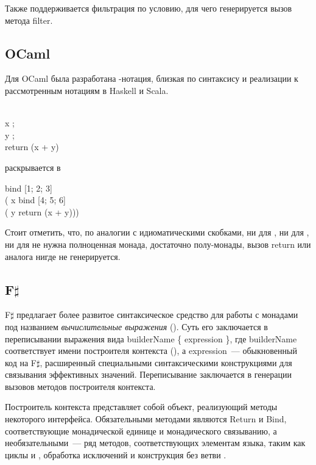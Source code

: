 Также поддерживается фильтрация по условию, для чего генерируется вызов метода \<filter\>. 

\subsection{OCaml}
Для OCaml\cite{leroy2010objective} была разработана \<\>-нотация\cite{carettesyntax}, близкая по синтаксису и реализации к рассмотренным нотациям в Haskell и Scala.

\begin{haskell}
 \\
\quad\quad x \longleftarrow [1; 2; 3]; \\
\quad\quad y \longleftarrow [4; 5; 6]; \\
\quad\quad return (x + y)
\end{haskell}
\hspace{0cm}раскрывается в
\begin{haskell}
bind [1; 2; 3] \\
\quad\quad\quad ( x \to bind [4; 5; 6] \\
\quad\quad\quad\quad\quad\quad\quad\quad\quad\quad ( y \to return (x + y)))
\end{haskell}

Стоит отметить, что, по аналогии с идиоматическими скобками, ни для \<\>, ни для \<\>, ни для \<\> не нужна полноценная монада, достаточно полу-монады, вызов \<return\> или аналога нигде не генерируется.

\subsection{F$\sharp$}
F$\sharp$ предлагает более развитое синтаксическое средство для работы с монадами под названием \emph{вычислительные выражения}\cite{ComputationExpressions} (). Суть его заключается в переписывании выражения вида \<builderName \{ expression \}\>, где \<builderName\> соответствует имени построителя контекста (), а \<expression\>~--- обыкновенный код на F$\sharp$, расширенный специальными синтаксическими конструкциями для связывания эффективных значений. Переписывание заключается в генерации вызовов методов построителя контекста.

Построитель контекста представляет собой объект, реализующий методы некоторого интерфейса. Обязательными методами являются \<Return\> и \<Bind\>, соответствующие монадической единице и монадического связыванию, а необязательными~--- ряд методов, соответствующих элементам языка, таким как циклы \<\> и \<\>, обработка исключений и конструкция \<\> без ветви \<\>.

